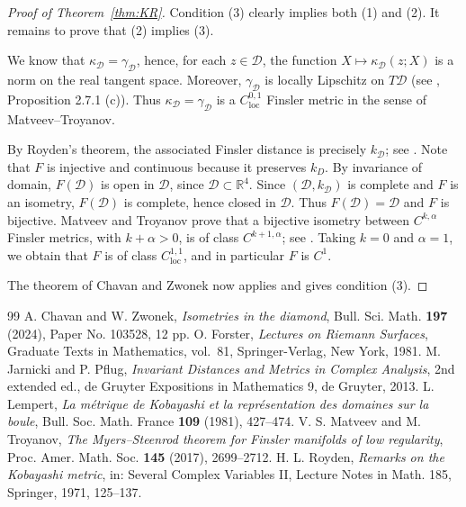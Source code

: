 \documentclass[10pt,a4paper]{amsart}
\newcommand{\D}{\mathcal D}
\newcommand{\kD}{k_{\D}}
\newcommand{\kapD}{\kappa_{\D}}
\begin{document}
\begin{proof}[Proof of Theorem~\ref{thm:KR}]
Condition {\rm (3)} clearly implies both {\rm (1)}
and {\rm (2)}. It remains to prove that {\rm (2)} implies {\rm (3)}.

We know that $\kapD=\gamma_{\D}$, hence, for each
$z\in\D$, the function $X\mapsto\kapD(z;X)$ is a norm on the real
tangent space.
Moreover, $\gamma_{\D}$ is locally Lipschitz on $T\D$ (see \cite{JP}, Proposition 2.7.1 (c)). Thus $\kapD=\gamma_{\D}$ is a $C^{0,1}_{\mathrm{loc}}$ Finsler metric in the sense of Matveev--Troyanov.

By Royden's theorem, the associated Finsler distance is precisely
$\kD$; see \cite{Royden,JP}.  Note that $F$ is injective and continuous because it preserves $k_D$. By invariance of domain, $F(\D)$ is open in $\D$, since $\D\subset\mathbb R^4$.
Since $(\D,\kD)$ is complete and $F$ is an isometry, $F(\D)$ is complete, hence closed in $\D$. Thus $F(\D)=\D$ and 
$F$ is bijective. Matveev and Troyanov prove that a
bijective isometry between $C^{k,\alpha}$ Finsler metrics, with $k+\alpha>0$,
is of class $C^{k+1,\alpha}$; see \cite[Corollary~C]{MT}. Taking
$k=0$ and $\alpha=1$, we obtain that $F$ is of class
$C^{1,1}_{\mathrm{loc}}$, and in particular $F$ is $C^1$.

The theorem of Chavan and Zwonek \cite[Theorem~1]{CZ} now applies and
gives condition {\rm (3)}.
\end{proof}


\begin{thebibliography}{99}
 A. Chavan and W. Zwonek, \emph{Isometries in the diamond}, Bull. Sci. Math. \textbf{197} (2024), Paper No. 103528, 12 pp.
 O. Forster, \textit{Lectures on Riemann Surfaces}, Graduate Texts in Mathematics, vol.~81, Springer-Verlag, New York, 1981.
 M. Jarnicki and P. Pflug, \emph{Invariant Distances and Metrics in Complex Analysis}, 2nd extended ed., de Gruyter Expositions in Mathematics 9, de Gruyter, 2013.
 L. Lempert, \emph{La m\'etrique de Kobayashi et la repr\'esentation des domaines sur la boule}, Bull. Soc. Math. France \textbf{109} (1981), 427--474.
 V. S. Matveev and M. Troyanov, \emph{The Myers--Steenrod theorem for Finsler manifolds of low regularity}, Proc. Amer. Math. Soc. \textbf{145} (2017), 2699--2712.
 H. L. Royden, \emph{Remarks on the Kobayashi metric}, in: Several Complex Variables II, Lecture Notes in Math. 185, Springer, 1971, 125--137.
\end{thebibliography}
\end{document}
